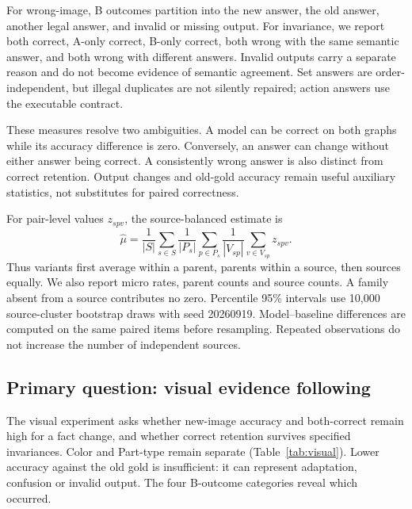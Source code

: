 \documentclass[10pt,twocolumn,letterpaper]{article}
\begin{document}
For wrong-image, B outcomes partition into the new answer, the old
answer, another legal answer, and invalid or missing output.
For invariance, we report both correct, A-only correct, B-only correct,
both wrong with the same semantic answer, and both wrong with different
answers. Invalid outputs carry a separate reason and do not become
evidence of semantic agreement. Set answers are order-independent,
but illegal duplicates are not silently repaired; action answers use
the executable contract.

These measures resolve two ambiguities. A model can be correct on
both graphs while its accuracy difference is zero. Conversely, an
answer can change without either answer being correct. A consistently
wrong answer is also distinct from correct retention. Output changes
and old-gold accuracy remain useful auxiliary statistics, not substitutes
for paired correctness.

For pair-level values $z_{spv}$, the source-balanced estimate is
\begin{equation}
\widehat{\mu}=\frac{1}{|S|}\sum_{s\in S}
 \frac{1}{|P_s|}\sum_{p\in P_s}
 \frac{1}{|V_{sp}|}\sum_{v\in V_{sp}}z_{spv}.
\end{equation}
Thus variants first average within a parent, parents within a source,
then sources equally. We also report micro rates, parent counts and
source counts. A family absent from a source contributes no zero.
Percentile 95\% intervals use 10,000 source-cluster bootstrap draws
with seed 20260919. Model--baseline differences are computed on the
same paired items before resampling. Repeated observations do not
increase the number of independent sources.

\subsection{Primary question: visual evidence following}
\begin{table}[t]
\centering\small
\caption{Core visual reporting, with fixed family denominators.
No validated learned-model results are available: ``--'' means not
run, never zero. Human answerability is pending. Family-specific
results replace an all-task capability ranking.}
\label{tab:visual}

\end{table}

The visual experiment asks whether new-image accuracy and both-correct
remain high for a fact change, and whether correct retention survives
specified invariances. Color and Part-type remain separate
(Table~\ref{tab:visual}). Lower accuracy against the old gold is
insufficient: it can represent adaptation, confusion or invalid output.
The four B-outcome categories reveal which occurred.
\end{document}
